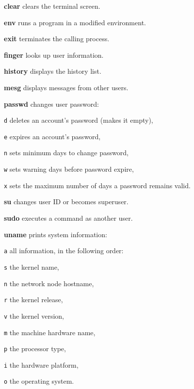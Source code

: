 \begin{enumx}
	\item [\cmd] \textbf{clear} clears the terminal screen.
	\item [\cmd] \textbf{env} runs a program in a modified environment.
	\item [\cmd] \textbf{exit} terminates the calling process.
	\item [\cmd] \textbf{finger} looks up user information.
	\item [\cmd] \textbf{history}  displays the history list. %
	\item [\cmd] \textbf{mesg} displays messages from other users.
\end{enumx}

\begin{enumx}
	\item [\cmd] \textbf{passwd} changes user password:
	\item [\texttt{d}] deletes an account's password (makes it empty),
	\item [\texttt{e}] expires an account's password,
	\item [\texttt{n}] sets minimum days to change password,
	\item [\texttt{w}] sets warning days before password expire,
	\item [\texttt{x}] sets the maximum number of days a password remains valid.
\end{enumx}

\begin{enumx}
	\item [\cmd] \textbf{su} changes user ID or becomes superuser.
	\item [\cmd] \textbf{sudo} executes a command as another user.
\end{enumx}

\begin{enumx}
	\item [\cmd] \textbf{uname} prints system information:
	\item [\texttt{a}] all information, in the following order:
	\item [\texttt{s}] the kernel name,
	\item [\texttt{n}] the network node hostname,
	\item [\texttt{r}] the kernel release,
	\item [\texttt{v}] the kernel version,
	\item [\texttt{m}] the machine hardware name,
	\item [\texttt{p}] the processor type,
	\item [\texttt{i}] the hardware platform,
	\item [\texttt{o}] the operating system.
\end{enumx}

